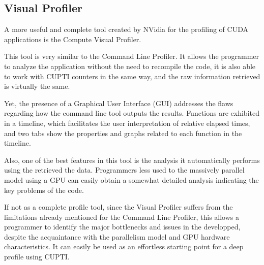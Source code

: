 \subsection{Visual Profiler}
\label{sec:340}

A more useful and complete tool created by NVidia for the profiling of CUDA applications is the Compute Visual Profiler.

This tool is very similar to the Command Line Profiler. It allows the programmer to analyze the application without the need to recompile the code, it is also able to work with CUPTI counters in the same way, and the raw information retrieved is virtually the same.

Yet, the presence of a Graphical User Interface (GUI) addresses the flaws regarding how the command line tool outputs the results. Functions are exhibited in a timeline, which facilitates the user interpretation of relative elapsed times, and two tabs show the properties and graphs related to each function in the timeline.

Also, one of the best features in this tool is the analysis it automatically performs using the retrieved the data. Programmers less used to the massively parallel model using a GPU can easily obtain a somewhat detailed analysis indicating the key problems of the code.

If not as a complete profile tool, since the Visual Profiler suffers from the limitations already mentioned for the Command Line Profiler, this allows a programmer to identify the major bottlenecks and issues in the developped, despite the acquaintance with the parallelism model and GPU hardware characteristics. It can easily be used as an effortless starting point for a deep profile using CUPTI.